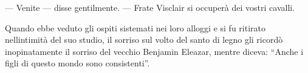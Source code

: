 --- Venite --- disse gentilmente. --- Frate Visclair si occuperà dei
vostri cavalli.

Quando ebbe veduto gli ospiti sistemati nei loro alloggi e si fu
ritirato nell\textquotesingle intimità del suo studio, il sorriso sul
volto del santo di legno gli ricordò inopinatamente il sorriso del
vecchio Benjamin Eleazar, mentre diceva: ``Anche i figli di questo mondo
sono consistenti''.
